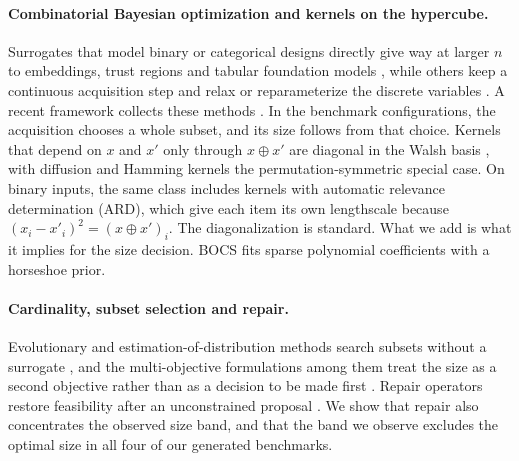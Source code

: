 \documentclass{article}
\newcommand{\revtext}[1]{{\color{blue}#1}}
\theoremstyle{remark}\newtheorem{remark}[proposition]{Remark}
\begin{document}
\paragraph{Combinatorial Bayesian optimization and kernels on the hypercube.}
Surrogates that model binary or categorical designs directly
\citep{baptista2018bayesian,oh2019combinatorial,deshwal2021mercer} give way at larger $n$ to
embeddings, trust regions and tabular foundation models
\citep{deshwal2023bayesian,papenmeier2023bounce,pmlr-v139-wan21b,hollmann2025accurate,yu2026git},
while others keep a continuous acquisition step and relax or reparameterize the
discrete variables \citep{daxberger2019mixed,daulton2022bayesian}. A recent framework
collects these methods \citep{dreczkowski2023framework}. \revtext{In the benchmark configurations, the acquisition chooses a whole subset, and its size follows from that choice.} Kernels that depend on $x$ and $x'$
only through $x\oplus x'$ are diagonal in the Walsh basis
\citep{o2014analysis}, with diffusion \citep{kondor2002diffusion} and
Hamming kernels the permutation-symmetric special case. \revtext{On binary inputs, the same class includes kernels with automatic relevance determination (ARD), which give each item its own lengthscale \citep{neal1996bayesian,rasmussen2006gaussian}} because
$(x_i-x'_i)^2=(x\oplus x')_i$. The diagonalization is standard. What we add is
what it implies for the size decision. \revtext{BOCS \citep{baptista2018bayesian} fits sparse polynomial coefficients with a horseshoe prior.}

\paragraph{Cardinality, subset selection and repair.}
Evolutionary and estimation-of-distribution methods search subsets without a
surrogate \citep{deb2002fast,zhang2007moea,baluja1994population}, and the
multi-objective formulations among them treat the size as a second objective
rather than as a decision to be made first \citep{qian2015neurips-subset,friedrich2015maximizing}. Repair operators restore feasibility
after an unconstrained proposal \citep{salcedo2009survey}. We show that repair
also concentrates the observed size band, and that the band we observe excludes
the optimal size in all four of our generated benchmarks.
\end{document}

